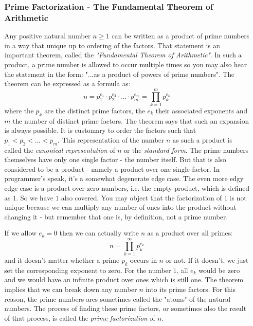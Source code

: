 \subsubsection{Prime Factorization - The Fundamental Theorem of Arithmetic}
Any positive natural number $n \geq 1$ can be written as a product of prime numbers in a way that unique up to ordering of the factors. That statement is an important theorem, called the \emph{"Fundamental Theorem of Arithmetic"}. In such a product, a prime number is allowed to occur multiple times so you may also hear the statement in the form: "...as a product of powers of prime numbers". The theorem can be expressed as a formula as:
\begin{equation}
 n = p_1^{e_1} \cdot p_2^{e_2} \cdot \ldots \cdot p_m^{e_m}
   = \prod_{k=1}^{m} p_k^{e_k}
\end{equation}
where the $p_k$ are the distinct prime factors, the $e_k$ their associated exponents and $m$ the number of distinct prime factors. The theorem says that such an expansion is always possible. It is customary to order the factors such that $p_1 < p_2 < \ldots < p_m$. This representation of the number $n$ as such a product is called the \emph{canonical representation} of $n$ or the \emph{standard form}. The prime numbers themselves have only one single factor - the number itself. But that is also considered to be a product - namely a product over one single factor. In programmer's speak, it's a somewhat degenerate edge case. The even more edgy edge case is a product over zero numbers, i.e. the empty product, which is defined as $1$. So we have $1$ also covered. You may object that the factorization of $1$ is not unique because we can multiply any number of ones into the product without changing it - but remember that one is, by definition, not a prime number. 

\medskip
If we allow $e_k = 0$ then we can actually write $n$ as a product over all primes:
\begin{equation}
 n = \prod_{k=1}^{\infty} p_k^{e_k}
\end{equation}
and it doesn't matter whether a prime $p_k$ occurs in $n$ or not. If it doesn't, we just set the corresponding exponent to zero. For the number $1$, all $e_k$ would be zero and we would have an infinite product over ones which is still one. The theorem implies that we can break down any number $n$ into its prime factors. For this reason, the prime numbers ares sometimes called the "atoms" of the natural numbers. The process of finding these prime factors, or sometimes also the result of that process, is called the \emph{prime factorization} of $n$.

